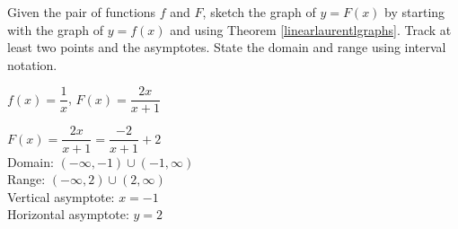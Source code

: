 \documentclass{ximera}
\begin{document}
\begin{problem}
Given the pair of functions $f$ and $F$, sketch the graph of $y=F(x)$ by starting with the graph of $y = f(x)$ and using Theorem \ref{linearlaurentlgraphs}.  Track at least two points and the asymptotes.  State the domain and range using interval notation.

$f(x) =\dfrac{1}{x}$, $F(x) = \dfrac{2x}{x+1}$

\begin{solution}
$F(x) = \dfrac{2x}{x+1} = \dfrac{-2}{x+1}+2$\\
Domain: $(-\infty, -1) \cup (-1, \infty)$ \\
Range: $(-\infty, 2) \cup (2, \infty)$ \\
Vertical asymptote:  $x = -1$\\
Horizontal asymptote:  $y = 2$ \\

    
\end{solution}

\end{problem}
\end{document}
